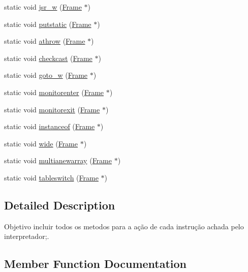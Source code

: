 \begin{DoxyCompactItemize}
\item 
static void \hyperlink{class_instruction_impl_ab9e24de0102f19dd84fd78d9d6bb9f21}{jsr\+\_\+w} (\hyperlink{struct_frame}{Frame} $\ast$)
\item 
static void \hyperlink{class_instruction_impl_a67fc568729a38dbd86f24667b928d440}{putstatic} (\hyperlink{struct_frame}{Frame} $\ast$)
\item 
static void \hyperlink{class_instruction_impl_a6d930daf9428f86993e14d24c38623c6}{athrow} (\hyperlink{struct_frame}{Frame} $\ast$)
\item 
static void \hyperlink{class_instruction_impl_a5139066782aa2227dc4c04876cdb14e2}{checkcast} (\hyperlink{struct_frame}{Frame} $\ast$)
\item 
static void \hyperlink{class_instruction_impl_a994c8fe4537365f45431a31bee553035}{goto\+\_\+w} (\hyperlink{struct_frame}{Frame} $\ast$)
\item 
static void \hyperlink{class_instruction_impl_ab71170e33262cb98957e70eb59d270c1}{monitorenter} (\hyperlink{struct_frame}{Frame} $\ast$)
\item 
static void \hyperlink{class_instruction_impl_a57ddfffe6adfd2c57fcea5d510554d57}{monitorexit} (\hyperlink{struct_frame}{Frame} $\ast$)
\item 
static void \hyperlink{class_instruction_impl_a6a0f0358baf22b30222d3bd476c2c5e5}{instanceof} (\hyperlink{struct_frame}{Frame} $\ast$)
\item 
static void \hyperlink{class_instruction_impl_af113b7ce37e5617c4f8a37fd63c2be7d}{wide} (\hyperlink{struct_frame}{Frame} $\ast$)
\item 
static void \hyperlink{class_instruction_impl_a411341be01a2f7c4a271ff5f91dc713d}{multianewarray} (\hyperlink{struct_frame}{Frame} $\ast$)
\item 
static void \hyperlink{class_instruction_impl_aac6c771f95ef1ab1d02da1a18ad68b26}{tableswitch} (\hyperlink{struct_frame}{Frame} $\ast$)
\end{DoxyCompactItemize}


\subsection{Detailed Description}
Objetivo incluir todos os metodos para a ação de cada instrução achada pelo interpretador;. 

\subsection{Member Function Documentation}
